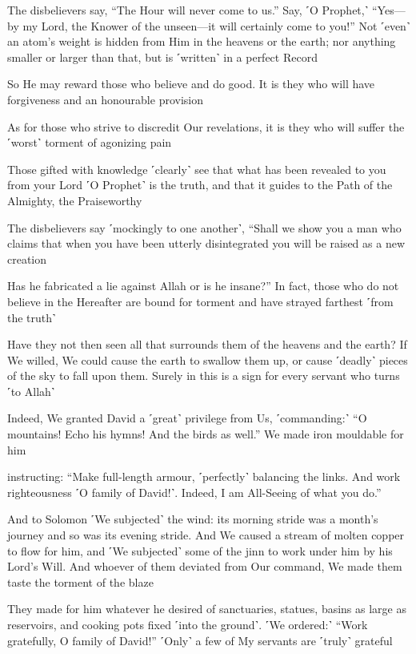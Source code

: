 The disbelievers say, “The Hour will never come to us.” Say, ˹O Prophet,˺ “Yes—by my Lord, the Knower of the unseen—it will certainly come to you!” Not ˹even˺ an atom’s weight is hidden from Him in the heavens or the earth; nor anything smaller or larger than that, but is ˹written˺ in a perfect Record

So He may reward those who believe and do good. It is they who will have forgiveness and an honourable provision

As for those who strive to discredit Our revelations, it is they who will suffer the ˹worst˺ torment of agonizing pain

Those gifted with knowledge ˹clearly˺ see that what has been revealed to you from your Lord ˹O Prophet˺ is the truth, and that it guides to the Path of the Almighty, the Praiseworthy

The disbelievers say ˹mockingly to one another˺, “Shall we show you a man who claims that when you have been utterly disintegrated you will be raised as a new creation

Has he fabricated a lie against Allah or is he insane?” In fact, those who do not believe in the Hereafter are bound for torment and have strayed farthest ˹from the truth˺

Have they not then seen all that surrounds them of the heavens and the earth? If We willed, We could cause the earth to swallow them up, or cause ˹deadly˺ pieces of the sky to fall upon them. Surely in this is a sign for every servant who turns ˹to Allah˺

Indeed, We granted David a ˹great˺ privilege from Us, ˹commanding:˺ “O mountains! Echo his hymns! And the birds as well.” We made iron mouldable for him

instructing: “Make full-length armour, ˹perfectly˺ balancing the links. And work righteousness ˹O family of David!˺. Indeed, I am All-Seeing of what you do.”

And to Solomon ˹We subjected˺ the wind: its morning stride was a month’s journey and so was its evening stride. And We caused a stream of molten copper to flow for him, and ˹We subjected˺ some of the jinn to work under him by his Lord’s Will. And whoever of them deviated from Our command, We made them taste the torment of the blaze

They made for him whatever he desired of sanctuaries, statues, basins as large as reservoirs, and cooking pots fixed ˹into the ground˺. ˹We ordered:˺ “Work gratefully, O family of David!” ˹Only˺ a few of My servants are ˹truly˺ grateful

